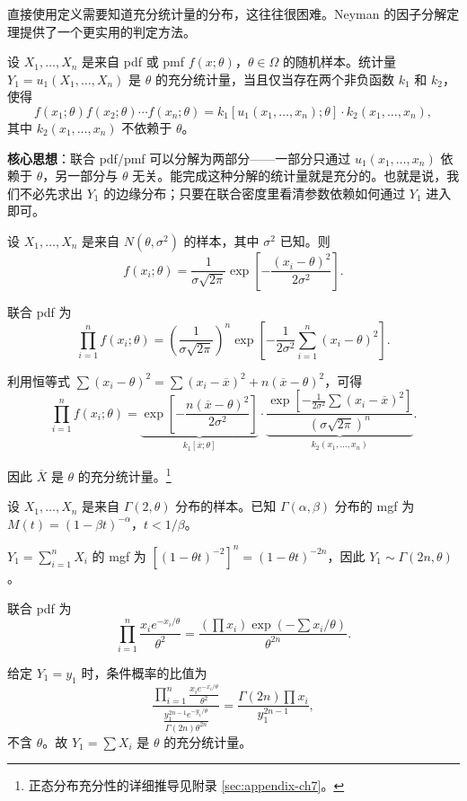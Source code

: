 直接使用定义需要知道充分统计量的分布，这往往很困难。Neyman 的因子分解定理提供了一个更实用的判定方法。

\begin{theorem}\label{th:factorization}
设 $X_1, \ldots, X_n$ 是来自 pdf 或 pmf $f(x; \theta)$，$\theta \in \Omega$ 的随机样本。统计量 $Y_1 = u_1(X_1, \ldots, X_n)$ 是 $\theta$ 的充分统计量，当且仅当存在两个非负函数 $k_1$ 和 $k_2$，使得
\[
f(x_1; \theta)f(x_2; \theta)\cdots f(x_n; \theta) = k_1[u_1(x_1, \ldots, x_n); \theta] \cdot k_2(x_1, \ldots, x_n),
\]
其中 $k_2(x_1, \ldots, x_n)$ 不依赖于 $\theta$。
\end{theorem}

\textbf{核心思想}：联合 pdf/pmf 可以分解为两部分——一部分只通过 $u_1(x_1, \ldots, x_n)$ 依赖于 $\theta$，另一部分与 $\theta$ 无关。能完成这种分解的统计量就是充分的。也就是说，我们不必先求出 $Y_1$ 的边缘分布；只要在联合密度里看清参数依赖如何通过 $Y_1$ 进入即可。

\begin{example}\label{ex:normal-sufficient}
设 $X_1, \ldots, X_n$ 是来自 $N(\theta, \sigma^2)$ 的样本，其中 $\sigma^2$ 已知。则
\[
f(x_i; \theta) = \frac{1}{\sigma\sqrt{2\pi}}\exp\left[-\frac{(x_i - \theta)^2}{2\sigma^2}\right].
\]

联合 pdf 为
\[
\prod_{i=1}^n f(x_i; \theta) = \left(\frac{1}{\sigma\sqrt{2\pi}}\right)^n \exp\left[-\frac{1}{2\sigma^2}\sum_{i=1}^n (x_i - \theta)^2\right].
\]

利用恒等式 $\sum (x_i - \theta)^2 = \sum (x_i - \overline{x})^2 + n(\overline{x} - \theta)^2$，可得
\[
\prod_{i=1}^n f(x_i; \theta) = \underbrace{\exp\left[-\frac{n(\overline{x} - \theta)^2}{2\sigma^2}\right]}_{k_1[\overline{x}; \theta]} \cdot \underbrace{\frac{\exp\left[-\frac{1}{2\sigma^2}\sum(x_i - \overline{x})^2\right]}{(\sigma\sqrt{2\pi})^n}}_{k_2(x_1, \ldots, x_n)}.
\]

因此 $\overline{X}$ 是 $\theta$ 的充分统计量。\footnote{正态分布充分性的详细推导见附录 \cref{sec:appendix-ch7}。}
\end{example}

\begin{example}[指数分布的充分统计量]\label{ex:exponential-sufficient}
设 $X_1, \ldots, X_n$ 是来自 $\Gamma(2, \theta)$ 分布的样本。已知 $\Gamma(\alpha, \beta)$ 分布的 mgf 为 $M(t) = (1 - \beta t)^{-\alpha}$，$t < 1/\beta$。

$Y_1 = \sum_{i=1}^n X_i$ 的 mgf 为 $[(1 - \theta t)^{-2}]^n = (1 - \theta t)^{-2n}$，因此 $Y_1 \sim \Gamma(2n, \theta)$。

联合 pdf 为
\[
\prod_{i=1}^n \frac{x_i e^{-x_i/\theta}}{\theta^2} = \frac{(\prod x_i) \exp(-\sum x_i/\theta)}{\theta^{2n}}.
\]

给定 $Y_1 = y_1$ 时，条件概率的比值为
\[
\frac{\prod_{i=1}^n \frac{x_i e^{-x_i/\theta}}{\theta^2}}{\frac{y_1^{2n-1} e^{-y_1/\theta}}{\Gamma(2n)\theta^{2n}}} = \frac{\Gamma(2n) \prod x_i}{y_1^{2n-1}},
\]
不含 $\theta$。故 $Y_1 = \sum X_i$ 是 $\theta$ 的充分统计量。
\end{example}

